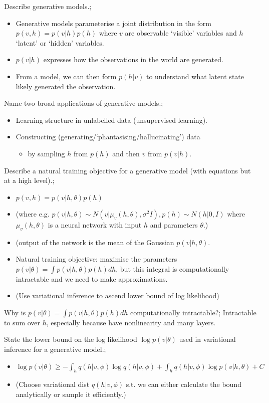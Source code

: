 \documentclass{article}
\begin{document}
Describe generative models.; \begin{itemize} \item Generative models parameterise a joint distribution in the form $p(v, h)=p(v|h)p(h)$ where $v$ are observable `visible' variables and $h$ `latent' or `hidden' variables. \item $p(v|h)$ expresses how the observations in the world are generated. \item From a model, we can then form $p(h|v)$ to understand what latent state likely generated the observation. \end{itemize}

Name two broad applications of generative models.; \begin{itemize} \item Learning structure in unlabelled data (unsupervised learning). \item Constructing (generating/`phantasising/hallucinating') data \begin{itemize} \item by sampling $h$ from $p(h)$ and then $v$ from $p(v|h)$. \end{itemize} \end{itemize}

Describe a natural training objective for a generative model (with equations but at a high level).; \begin{itemize} \item $p(v, h) = p(v|h, \theta)p(h)$  \item (where e.g. $p(v|h, \theta) \sim N(v| \mu_v(h,\theta), \sigma^2I), p(h)\sim N(h|0, I)$ where $\mu_v(h, \theta)$ is a neural network with input $h$ and parameters $\theta$.) \item (output of the network is the mean of the Gaussian $p(v|h, \theta)$. \item Natural training objective: maximise the parameters $p(v|\theta) = \int p(v|h, \theta)p(h)dh$, but this integral is computationally intractable and we need to make approximations. \item (Use variational inference to ascend lower bound of log likelihood) \end{itemize}

Why is $p(v|\theta) = \int p(v|h, \theta)p(h)dh$ computationally intractable?; Intractable to sum over $h$, especially because have nonlinearity and many layers. 

State the lower bound on the log likelihood $\log p(v|\theta)$ used in variational inference for a generative model.; \begin{itemize} \item $\log p(v|\theta) \geq - \int_h q(h|v, \phi)\log q(h|v, \phi) + \int_h q(h|v, \phi)\log p(v|h, \theta) + C$ \item (Choose variational dist $q(h|v, \phi)$ s.t. we can either calculate the bound analytically or sample it efficiently.) \end{itemize}
\end{document}
